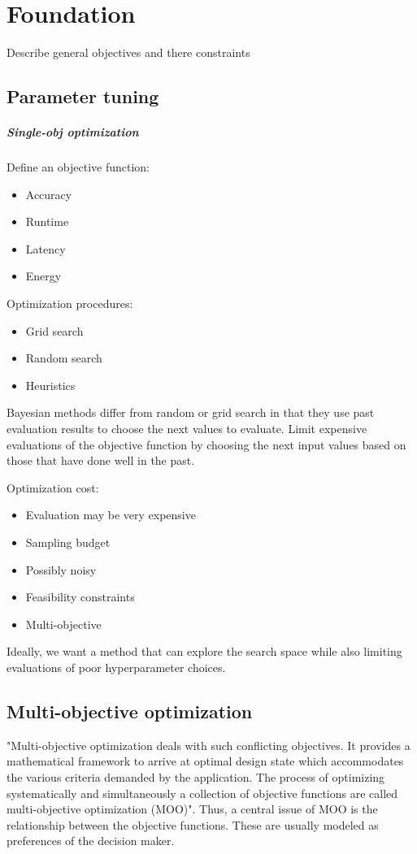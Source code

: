 \chapter{Foundation}
    Describe general objectives and there constraints

    \section{Parameter tuning}
    \paragraph{Single-obj optimization}
    Define an objective function: 
    \begin{itemize}
        \item Accuracy
        \item Runtime
        \item Latency
        \item Energy
    \end{itemize}

    Optimization procedures:
    \begin{itemize}
        \item Grid search
        \item Random search
        \item Heuristics
    \end{itemize}
    Bayesian methods differ from random or grid search in that they use past evaluation results to choose the next values to evaluate.
    Limit expensive evaluations of the objective function by choosing the next input values based on those that have done well in the past.

    Optimization cost:
    \begin{itemize}
        \item Evaluation may be very expensive
        \item Sampling budget
        \item Possibly noisy
        \item Feasibility constraints
        \item Multi-objective
    \end{itemize}
    Ideally, we want a method that can explore the search space while also limiting evaluations of poor hyperparameter choices.

    
    \section{Multi-objective optimization}
        "Multi-objective optimization deals with such conflicting objectives. It provides a
        mathematical framework to arrive at optimal design state which accommodates the various criteria demanded by
        the application. The process of optimizing systematically and simultaneously a collection of objective functions
        are called multi-objective optimization (MOO)\cite{odugod2013}".
        Thus, a central issue of MOO is the relationship between the objective functions. These are usually modeled as preferences of the decision maker.

